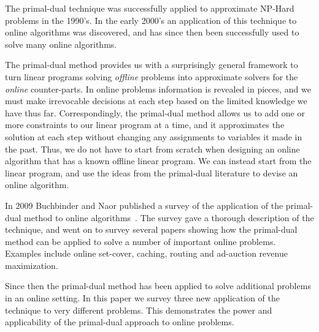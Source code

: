 The primal-dual technique was successfully applied to approximate NP-Hard problems in the 1990's.
In the early 2000's an application of this technique to online algorithms was discovered, and has since then been successfully used to solve many online algorithms.

The primal-dual method provides us with a surprisingly general framework to turn linear programs solving \emph{offline} problems into approximate solvers for the \emph{online} counter-parts.
In online problems information is revealed in pieces, and we must make irrevocable decisions at each step based on the limited knowledge we have thus far.
Correspondingly, the primal-dual method allows us to add one or more constraints to our linear program at a time, and it approximates the solution at each step without changing any assignments to variables it made in the past.
Thus, we do not have to start from scratch when designing an online algorithm that has a known offline linear program.
We can instead start from the linear program, and use the ideas from the primal-dual literature to devise an online algorithm.

In 2009 Buchbinder and Naor published a survey of the application of the primal-dual method to online algorithms~\cite{buchbinder09:survey}.
The survey gave a thorough description of the technique, and went on to survey several papers showing how the primal-dual method can be applied to solve a number of important online problems. 
Examples include online set-cover, caching, routing and ad-auction revenue maximization.

Since then the primal-dual method has been applied to solve additional problems in an online setting.
In this paper we survey three new application of the technique to very different problems.
This demonstrates the power and applicability of the primal-dual approach to online problems.

